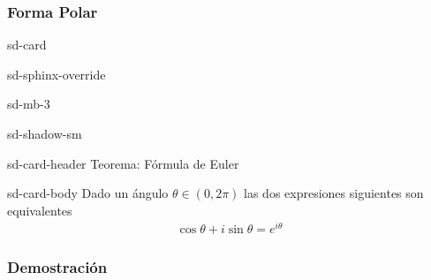 \documentclass[letterpaper,10pt,english]{jupyterBook}
\begin{document}
\subsubsection{Forma Polar}
\label{\detokenize{docs/Part_01_Formalismo/Chapter_01_02_Formalismo_matem_xe1tico/01_01_Numeros_Complejos_myst:forma-polar}}
\begin{sphinxuseclass}{sd-card}
\begin{sphinxuseclass}{sd-sphinx-override}
\begin{sphinxuseclass}{sd-mb-3}
\begin{sphinxuseclass}{sd-shadow-sm}
\begin{sphinxuseclass}{sd-card-header}
\sphinxAtStartPar
Teorema: Fórmula de Euler

\end{sphinxuseclass}
\begin{sphinxuseclass}{sd-card-body}
\sphinxAtStartPar
Dado un ángulo \(\theta \in (0,2\pi)\) las dos expresiones siguientes son equivalentes
\begin{equation*}
\begin{split}
\cos\theta + i \sin \theta = e^{i\theta} 
\end{split}
\end{equation*}
\end{sphinxuseclass}
\end{sphinxuseclass}
\end{sphinxuseclass}
\end{sphinxuseclass}
\end{sphinxuseclass}\subsubsection*{Demostración}
\end{document}
